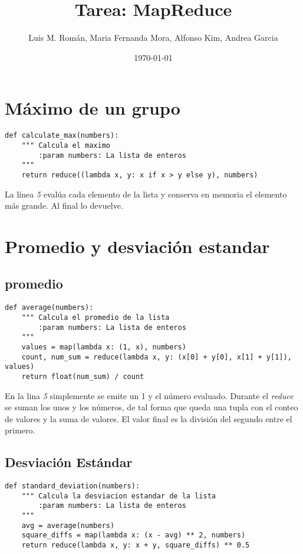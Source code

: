 \documentclass[12pt]{article}
\title{Tarea: MapReduce}
\author{Luis M. Román, Maria Fernanda Mora, Alfonso Kim, Andrea Garcia }
\date{\today}
\begin{document}
\maketitle

\section{Máximo de un grupo}

\begin{verbatim}
def calculate_max(numbers):
    """ Calcula el maximo
        :param numbers: La lista de enteros
    """
    return reduce((lambda x, y: x if x > y else y), numbers) 
\end{verbatim} 

La línea \textit{5} evalúa cada elemento de la lista y conserva en memoria el elemento más grande. Al final lo devuelve.\bigskip


\section{Promedio y desviación estandar}

\subsection{promedio}

\begin{verbatim}
def average(numbers):
    """ Calcula el promedio de la lista
        :param numbers: La lista de enteros
    """
    values = map(lambda x: (1, x), numbers)
    count, num_sum = reduce(lambda x, y: (x[0] + y[0], x[1] + y[1]), values)
    return float(num_sum) / count
\end{verbatim}  

En la lina \textit{5} simplemente se emite un 1 y el número evaluado. Durante el \textit{reduce} se suman los unos y los números, de tal forma que queda una tupla con el conteo de valores y la suma de valores. El valor final es la división del segundo entre el primero.

\subsection{Desviación Estándar}
\begin{verbatim}
def standard_deviation(numbers):
    """ Calcula la desviacion estandar de la lista
        :param numbers: La lista de enteros
    """
    avg = average(numbers)
    square_diffs = map(lambda x: (x - avg) ** 2, numbers)
    return reduce(lambda x, y: x + y, square_diffs) ** 0.5
\end{verbatim}  
\end{document}
